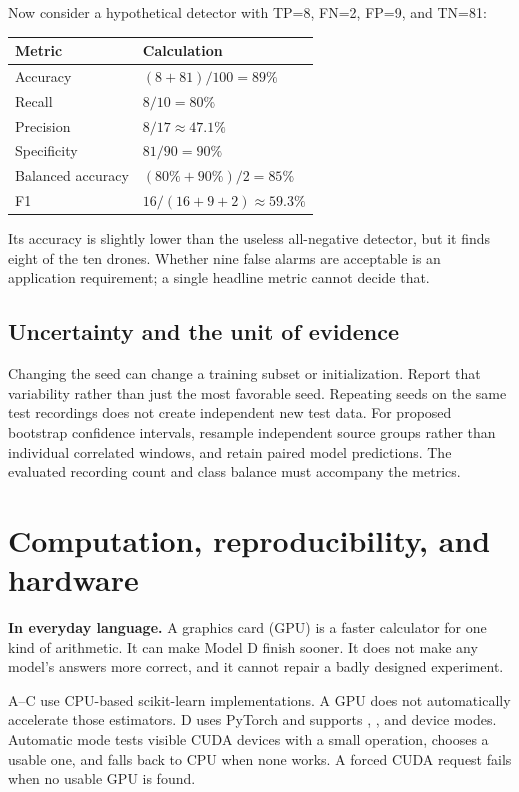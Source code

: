 \documentclass[11pt,letterpaper]{article}
\newcommand{\code}[1]{\texttt{\detokenize{#1}}}
\newcommand{\plain}[1]{\par\smallskip\noindent\textbf{In everyday language.} #1\par\smallskip}
\begin{document}
Now consider a hypothetical detector with TP=8, FN=2, FP=9, and TN=81:
\begin{center}
\begin{tabular}{@{}ll@{}}
\toprule
Metric & Calculation \\
\midrule
Accuracy & $(8+81)/100=89\%$ \\
Recall & $8/10=80\%$ \\
Precision & $8/17\approx47.1\%$ \\
Specificity & $81/90=90\%$ \\
Balanced accuracy & $(80\%+90\%)/2=85\%$ \\
F1 & $16/(16+9+2)\approx59.3\%$ \\
\bottomrule
\end{tabular}
\end{center}
Its accuracy is slightly lower than the useless all-negative detector, but it
finds eight of the ten drones. Whether nine false alarms are acceptable is
an application requirement; a single headline metric cannot decide that.

\subsection{Uncertainty and the unit of evidence}
Changing the seed can change a training subset or initialization. Report that
variability rather than just the most favorable seed. Repeating seeds on the
same test recordings does not create independent new test data. For proposed
bootstrap confidence intervals, resample independent source groups rather
than individual correlated windows, and retain paired model predictions.
The evaluated recording count and class balance must accompany the metrics.

\section{Computation, reproducibility, and hardware}
\label{sec:hardware}
\plain{A graphics card (GPU) is a faster calculator for one kind of
arithmetic. It can make Model D finish sooner. It does not make any model's
answers more correct, and it cannot repair a badly designed experiment.}

A--C use CPU-based scikit-learn implementations. A GPU does not automatically
accelerate those estimators. D uses PyTorch and supports \code{auto},
\code{cpu}, and \code{cuda} device modes. Automatic mode tests visible CUDA
devices with a small operation, chooses a usable one, and falls back to CPU
when none works. A forced CUDA request fails when no usable GPU is found.
\end{document}
